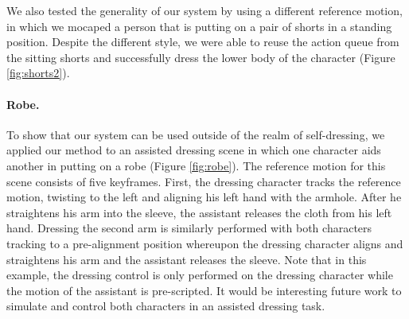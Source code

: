 We also tested the generality of our system by using a different reference motion, in which we mocaped a person that is putting on a pair of shorts in a standing position. Despite the different style, we were able to reuse the action queue from the sitting shorts and successfully dress the lower body of the character (Figure \ref{fig:shorts2}).

\paragraph{Robe.} To show that our system can be used outside of the realm of self-dressing, we applied our method to an assisted dressing scene in which one character aids another in putting on a robe (Figure \ref{fig:robe}). The reference motion for this scene consists of five keyframes. First, the dressing character tracks the reference motion, twisting to the left and aligning his left hand with the armhole. After he straightens his arm into the sleeve, the assistant releases the cloth from his left hand. Dressing the second arm is similarly performed with both characters tracking to a pre-alignment position whereupon the dressing character aligns and straightens his arm and the assistant releases the sleeve. Note that in this example, the dressing control is only performed on the dressing character while the motion of the assistant is pre-scripted. It would be interesting future work to simulate and control both characters in an assisted dressing task.
